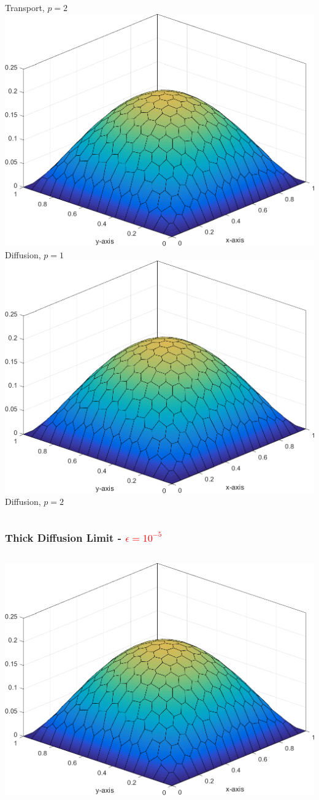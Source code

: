 \documentclass[compress,10pt]{beamer}
\newcommand{\tcr}[1]{\textcolor{red}{#1}}
\begin{document}
\begin{frame}[t]
{\begin{columns}
Transport, $p=2$
\centering
{}\includegraphics[width=0.75\columnwidth]{images/Sq_poly_MAXENT_k=1.png}\\
Diffusion, $p=1$
{}\includegraphics[width=0.75\columnwidth]{images/Sq_poly_MAXENT_k=2.png}\\
Diffusion, $p=2$
\end{columns}
}
{
\frametitle{Thick Diffusion Limit - \tcr{$\epsilon = 10^{-5}$}}
\begin{columns}
\centering
{}\includegraphics[width=0.75\columnwidth]{images/Sq_poly_MAXENT_k=1_ep=1e-5.png}\\

\end{columns}}
\end{frame}
\end{document}
